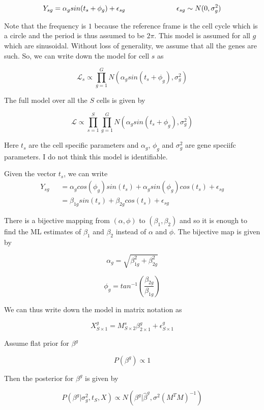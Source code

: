 \documentclass[11pt]{article}
\begin{document}
$$ Y_{sg} = \alpha_g sin (t_s + \phi_g) + \epsilon_{sg}  \hspace{1 in}  \epsilon_{sg} \sim N(0, \sigma^2_{g}) $$

Note that the frequency is $1$ because the reference frame is the cell cycle which is a circle and the period is thus assumed to be $2 \pi$. This model is assumed for all $g$ which are sinusoidal. Without loss of generality, we assume that all the genes are such. So, we can write down the model  for cell $s$ as 

$$ \mathcal{L}_{s}  \propto \prod_{g=1}^{G} N ( \alpha_g sin (t_s + \phi_g), \sigma^2_{g} )  $$

The full model over all the $S$ cells is given by 

$$ \mathcal{L} \propto \prod_{s=1}^{S} \prod_{g=1}^{G} N ( \alpha_g sin (t_s + \phi_g), \sigma^2_{g} ) $$

Here $t_s$ are the cell specific parameters and $\alpha_g$, $\phi_g$ and $\sigma^2_g$ are gene speciifc parameters. I do not think this model is identifiable. 

Given the vector $t_s$, we can write 
\begin{align*}
Y_{sg}  & = \alpha_g  cos(\phi_g) sin (t_s) + \alpha_g sin (\phi_g) cos(t_s) + \epsilon_{sg}   \\
\qquad & = \beta_{1g} sin(t_s) + \beta_{2g} cos(t_s) + \epsilon_{sg}  
\end{align*}



There is a bijective mapping from $(\alpha,\phi)$ to $(\beta_1, \beta_2)$ and so it is enough to find the ML estimates of $\beta_1$ and $\beta_2$ instead of $\alpha$ and $\phi$. The bijective map is given by 

$$ \alpha_g = \sqrt{\beta^2_{1g} + \beta^2_{2g} }$$

$$ \phi_g = tan^{-1}  \left (\frac{\beta_{2g}}{\beta_{1g}} \right ) $$

We can thus write down the model in matrix notation as 

$$ X^{g}_{S \times 1} = M^{s}_{S \times 2}  \beta^{g}_{2 \times 1} + \epsilon^{g}_{S \times 1} $$

Assume flat prior for $\beta^g$

$$ P(\beta^{g}) \propto 1 $$

Then the posterior for $\beta^g$ is given by 

$$ P(\beta^{g} | \sigma^2_g, t_S, X ) \propto N(\beta^{g} | \hat{\beta}^{g}, \sigma^2 (M^{T}M)^{-1}) $$ 
\end{document}
